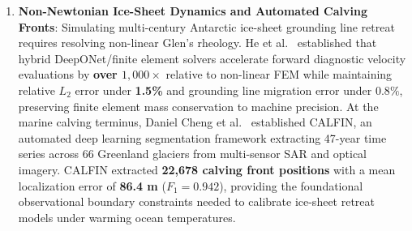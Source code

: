 \begin{enumerate}
    \item \textbf{Non-Newtonian Ice-Sheet Dynamics and Automated Calving Fronts}: Simulating multi-century Antarctic ice-sheet grounding line retreat requires resolving non-linear Glen's rheology. He et al.~\cite{he2023hybrid} established that hybrid DeepONet/finite element solvers accelerate forward diagnostic velocity evaluations by \textbf{over $1{,}000\times$} relative to non-linear FEM while maintaining relative $L_2$ error under \textbf{1.5\%} and grounding line migration error under $0.8\%$, preserving finite element mass conservation to machine precision. At the marine calving terminus, Daniel Cheng et al.~\cite{cheng2021calfin} established CALFIN, an automated deep learning segmentation framework extracting 47-year time series across 66 Greenland glaciers from multi-sensor SAR and optical imagery. CALFIN extracted \textbf{22,678 calving front positions} with a mean localization error of \textbf{86.4 m} ($F_1 = 0.942$), providing the foundational observational boundary constraints needed to calibrate ice-sheet retreat models under warming ocean temperatures.
\end{enumerate}

